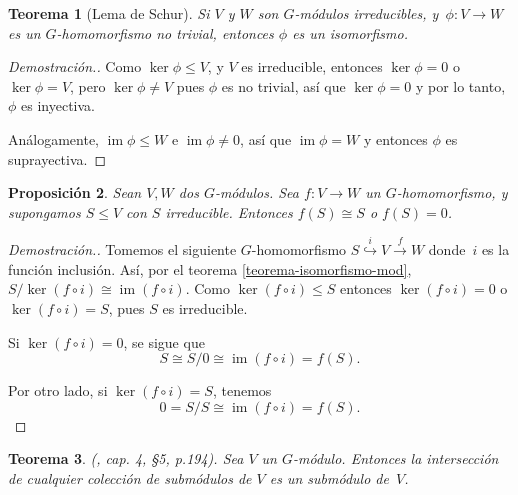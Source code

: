 \documentclass[12pt]{book}
\newtheorem{theorem}{Teorema}[section]
\newtheorem{proposition}[theorem]{Proposición}
\theoremstyle{definition}
\DeclareMathOperator{\im}{im}
\newcounter{in}
\begin{document}
\begin{theorem}[Lema de Schur]
  \label{lema-schur}
  Si $V$ y $W$ son $G$-módulos irreducibles, y~$\phi:V\rightarrow W$
  es un $G$-homomorfismo no trivial, entonces $\phi$ es un isomorfismo.
\end{theorem}

\begin{proof}[Demostración.]
  Como $\ker \phi\leq V$, y $V$ es irreducible, entonces $\ker \phi=0$
  o~$\ker\phi=V$, pero  $\ker\phi\neq V$ pues $\phi$ es no trivial,
  así que $\ker \phi=0$ y por lo tanto, $\phi$ es inyectiva. 

  Análogamente, $\im\phi\leq W$ e $\im \phi\neq 0$, así que $\im
  \phi=W$ y entonces $\phi$ es suprayectiva.
\end{proof}

\begin{proposition}
  \label{im-mod-irreducible}
  Sean $V,W$ dos $G$-módulos. Sea $f:V\rightarrow W$ un
  $G$-homomorfismo, y supongamos $S\leq V$ con $S$ irreducible. Entonces $f(S)\cong
  S$ o $f(S)=0$.
\end{proposition}

\begin{proof}[Demostración.]
  Tomemos el siguiente $G$-homomorfismo
  $S\stackrel{i}{\hookrightarrow} V\stackrel{f}{\rightarrow}W$
  donde~$i$ es la función inclusión. Así, por el teorema \ref{teorema-isomorfismo-mod}, $S/\ker(f\circ
  i)\cong\im(f\circ i)$. Como $\ker(f\circ
  i)\leq S$ entonces $\ker(f\circ i)=0$ o $\ker(f\circ i)=S$, pues $S$
  es irreducible.

  Si $\ker(f\circ i)=0$, se sigue que
  $$S\cong S/0\cong\im(f\circ i)=f(S).$$

  Por otro lado, si $\ker(f\circ i)=S$, tenemos
  $$0=S/S\cong\im(f\circ i)=f(S).$$
\end{proof}
\begin{theorem}{\normalfont (\cite{herstein1990algebra}, cap. 4, \S 5, p.194).}
  \label{interseccion-submodulos}
  Sea $V$ un $G$-módulo. Entonces la intersección de cualquier
  colección de submódulos de $V$ es un submódulo de~$V$.
\end{theorem}
\end{document}
